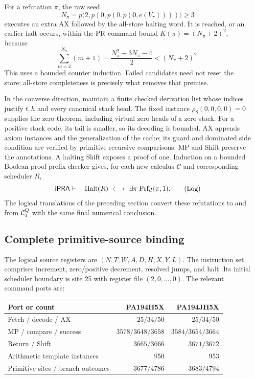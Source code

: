 For a refutation $\pi$, the raw seed
\[
 N_\pi=p\bigl(2,p(0,p(0,p(0,e(V_\pi))))\bigr)\ge3
\]
executes an extra AX followed by the all-store halting word.  It is
reached, or an earlier halt occurs, within the PR command bound
$K(\pi)=(N_\pi+2)^2$, because
\[
 \sum_{m=2}^{N_\pi}(m+1)
       =\frac{N_\pi^2+3N_\pi-4}{2}<(N_\pi+2)^2.
\]
This uses a bounded counter induction.  Failed candidates need not reset
the store; all-store completeness is precisely what removes that premise.

In the converse direction, maintain a finite checked derivation list
whose indices justify $t,h$ and every canonical stack head.  The fixed
instance $\rho_8(0,0,0,0)=0$ supplies the zero theorem, including virtual
zero heads of a zero stack.  For a positive stack code, its tail is
smaller, so its decoding is bounded.  AX appends axiom instances and the
generalization of the cache; its guard and dominated side condition are
verified by primitive recursive comparisons.  MP and Shift preserve the
annotations.  A halting Shift exposes a proof of one.  Induction on a
bounded Boolean proof-prefix checker gives, for each new calculus
$\mathcal C$ and corresponding scheduler $R$,
\[
 \mathsf{iPRA}\vdash\quad
 \operatorname{Halt}(R)\ \longleftrightarrow\
                \exists\pi\,\operatorname{Prf}_{\mathcal C}(\pi,1).
 \tag{Log}
\]
The logical translations of the preceding section convert these
refutations to and from $\mathcal C_4^Q$ with the same final numerical conclusion.

\subsection{Complete primitive-source binding}

The logical source registers are $(N,T,W,A,D,H,X,Y,L)$.  The instruction
set comprises increment, zero/positive decrement, resolved jumps, and
halt.  Its initial scheduler boundary is site 25 with register file
$(2,0,\ldots,0)$.  The relevant command ports are:
\begin{center}
\begin{tabular}{@{}lrr@{}}
\toprule
Port or count & PA194H5X & PA194JH5X\\\midrule
Fetch / decode / AX & $25/34/50$ & $25/34/50$\\
MP / compare / success & $3578/3648/3658$ & $3584/3654/3664$\\
Return / Shift & $3665/3666$ & $3671/3672$\\
Arithmetic template instances & 950 & 953\\
Primitive sites / branch outcomes & $3677/4786$ & $3683/4794$\\
\bottomrule
\end{tabular}
\end{center}


